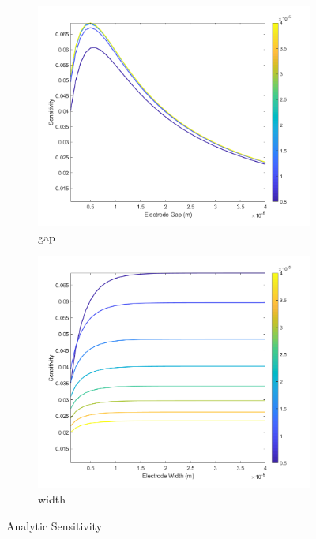 \begin{figure}[h]
\begin{subfigure}[b]{0.49\textwidth}
        \centering
        \includegraphics[width=\textwidth]{images/analytic_sun_gapXsensitivity_extended.png}
        \caption{gap}
    \end{subfigure}
    \hfill
    \begin{subfigure}[b]{0.49\textwidth}
        \centering
        \includegraphics[width=\textwidth]{images/analytic_sun_widthXsensitivity_extended.png}
        \caption{width}
    \end{subfigure}
    \caption[Analytic Sensitivity]{Analytic Sensitivity}
    \label{fig:analytic_sensitivity}
\end{figure}

